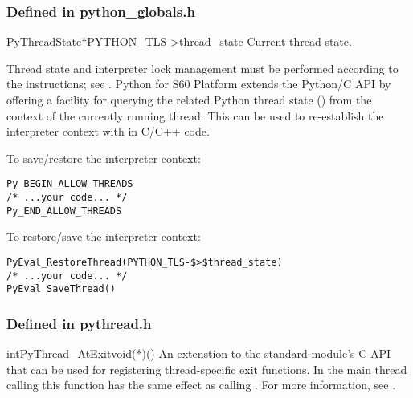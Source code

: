 \subsubsection{Defined in python_globals.h}
\begin{cvardesc}{PyThreadState*}{PYTHON_TLS->thread_state}
Current thread state.
\end{cvardesc}

Thread state and interpreter lock management must be performed
according to the instructions; see \cite{PyCAPI}. Python for S60
Platform extends the Python/C API by offering a facility for querying
the related Python thread state () from the context of the currently running thread. This
can be used to re-establish the interpreter context with
 in C/C++ code.

To save/restore the interpreter context:
\begin{verbatim}
Py_BEGIN_ALLOW_THREADS
/* ...your code... */
Py_END_ALLOW_THREADS
\end{verbatim}

To restore/save the interpreter context:
\begin{verbatim}
PyEval_RestoreThread(PYTHON_TLS-$>$thread_state)
/* ...your code... */
PyEval_SaveThread()
\end{verbatim}

\subsubsection{Defined in pythread.h}

\begin{cfuncdesc}{int}{PyThread_AtExit}{void(*)()}
An extenstion to the standard  module's C API that
can be used for registering thread-specific exit functions. In the
main thread calling this function has the same effect as calling
. For more information, see \cite{PyLibRef}.
\end{cfuncdesc}
